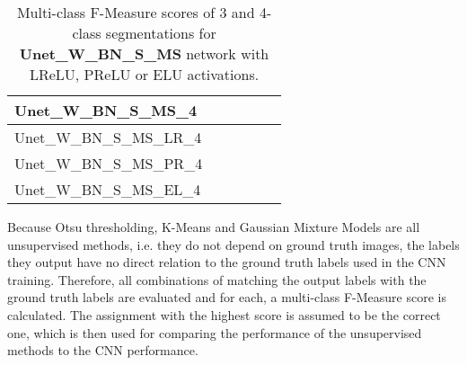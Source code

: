 \begin {table}
\begin{flushleft}
\begin {tabular}[!htb]{|l|l|l|l|l|l|}
			Unet\_W\_BN\_S\_MS\_4& & & & & \\ \hline
			Unet\_W\_BN\_S\_MS\_LR\_4& & & & & \\ \hline
			Unet\_W\_BN\_S\_MS\_PR\_4& & & & & \\ \hline
			Unet\_W\_BN\_S\_MS\_EL\_4& & & & & \\ \hline
		\end {tabular}
	\end {flushleft}
\caption[Multi-class F-Measure scores for networks with different activation functions.]{Multi-class F-Measure scores of 3 and 4-class segmentations for  \textbf{Unet\_W\_BN\_S\_MS} network with LReLU, PReLU or ELU activations.}
\label{tab:results5}
\end {table}


\noindent Because Otsu thresholding, K-Means and Gaussian Mixture Models are all unsupervised methods, i.e. they do not depend on ground truth images, the labels they output have no direct relation to the ground truth labels used in the CNN training. Therefore, all combinations of matching the output labels with the ground truth labels are evaluated and for each, a multi-class F-Measure score is calculated. The assignment with the highest score is assumed to be the correct one, which is then used for comparing the performance of the unsupervised methods to the CNN performance.\\



